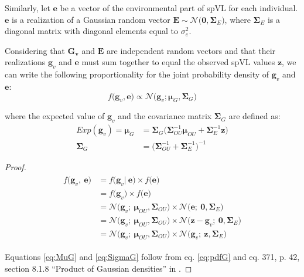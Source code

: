 \documentclass[]{article}
\begin{document}
\begin{doublespace}
Similarly, let $\bm{e}$ be a vector of the environmental part of spVL for each individual.  $\bm{e}$ is a realization of a Gaussian random vector $\bm{E} \sim \mathcal{N}\big(\bm{0}, \boldsymbol{\Sigma}_E\big)$, where $\boldsymbol{\Sigma}_E$ is a diagonal matrix with diagonal elements equal to $\sigma^2_e$.

Considering that $\bm{G_v}$ and $\bm{E}$ are independent random vectors and that their realizations $\bm{g}_v$ and $\bm{e}$ must sum together to equal the observed spVL values $\bm{z}$, we can write the following proportionality for the joint probability density of $\bm{g}_v$ and $\bm{e}$:
\begin{equation}
	f\big(\bm{g}_v, \bm{e}\big) \propto \mathcal{N}\big(\bm{g}_v; \bm{\mu}_{G}, \boldsymbol{\Sigma}_G\big)
	\label{eq:pdfGprop}
\end{equation} 

where the expected value of $\bm{g}_v$ and the covariance matrix $\boldsymbol{\Sigma}_G$ are defined as:
\begin{align}
	Exp(\bm{g}_v) = \bm{\mu}_{G} &=  \boldsymbol{\Sigma}_G\big(\boldsymbol{\Sigma}_{OU}^{-1}\bm{\mu}_{OU} + \boldsymbol{\Sigma}_E^{-1} \bm{z}\big) \label{eq:MuG}\\
	\boldsymbol{\Sigma}_G &= \big(\boldsymbol{\Sigma}_{OU}^{-1} + \boldsymbol{\Sigma}_E^{-1}\big)^{-1} \label{eq:SigmaG}
\end{align}

\begin{proof}
	\begin{align}\label{eq:pdfG}
	\begin{split}
		f\big(\bm{g}_v,\ \bm{e}\big) &= f\big(\bm{g}_v|\ \bm{e}\big) \times f\big(\bm{e}\big) \\
	&= f\big(\bm{g}_v\big) \times f\big(\bm{e}\big) \\
	&= \mathcal{N}\big(\bm{g}_v;\ \bm{\mu}_{OU}, \mathbf{\Sigma}_{OU}\big) \times \mathcal{N}\big(\bm{e};\ \bm{0}, \mathbf{\Sigma}_E\big) \\
	&= \mathcal{N}\big(\bm{g}_v;\ \bm{\mu}_{OU}, \mathbf{\Sigma}_{OU}\big) \times \mathcal{N}\big(\bm{z} - \bm{g}_v;\ \bm{0}, \mathbf{\Sigma}_E\big) \\
	&= \mathcal{N}\big(\bm{g}_v;\ \bm{\mu}_{OU}, \mathbf{\Sigma}_{OU}\big) \times \mathcal{N}\big(\bm{g}_v;\ \bm{z}, \mathbf{\Sigma}_E\big)
	\end{split}
\end{align}
	
	Equations \ref{eq:MuG} and \ref{eq:SigmaG} follow from eq. \ref{eq:pdfG} and eq. 371, p. 42, section 8.1.8 ``Product of Gaussian densities'' in \citep{Petersen2012}.
\end{proof}


\end{doublespace}
\end{document}
